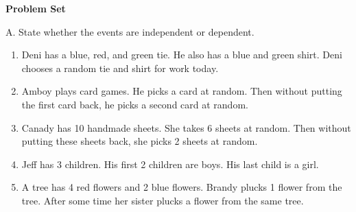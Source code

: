 \textbf{Problem Set}

\vspce

A. State whether the events are independent or dependent.

\begin{enumerate}[label = \arabic*. ]
\item Deni has a blue, red, and green  tie. He  also has a blue  and green shirt.  Deni chooses a random  tie and shirt for work today. 

\item Amboy plays card games. He  picks a card at  random. Then without putting the first card back, he picks a second card at random. 

\item Canady  has 10 handmade sheets. She takes 6 sheets at random. Then  without putting these sheets  back, she picks 2 sheets at random.

\item Jeff has 3 children. His first 2 children are boys. His last child is a girl.

\item A tree has 4 red flowers and 2 blue flowers. Brandy  plucks 1 flower from the tree. After some time her sister plucks a flower from the same tree.


\end{enumerate}  

